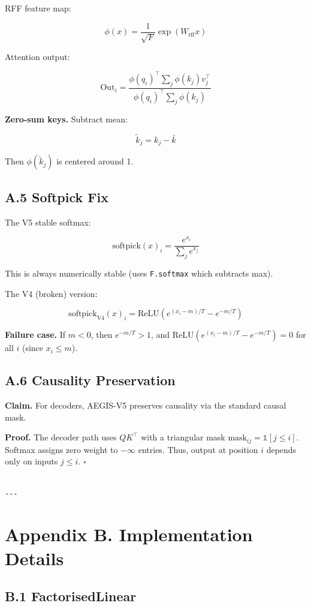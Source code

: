 RFF feature map:

\[
\phi(x) = \frac{1}{\sqrt{F}} \exp(W_\text{rff} x)
\]

Attention output:

\[
\text{Out}_i = \frac{\phi(q_i)^\top \sum_j \phi(k_j) v_j^\top}{\phi(q_i)^\top \sum_j \phi(k_j)}
\]

\textbf{Zero-sum keys.} Subtract mean:

\[
\tilde{k}_j = k_j - \bar{k}
\]

Then $\phi(\tilde{k}_j)$ is centered around 1.

\subsection{A.5 Softpick Fix}

The V5 stable softmax:

\[
\text{softpick}(x)_i = \frac{e^{x_i}}{\sum_j e^{x_j}}
\]

This is always numerically stable (uses \texttt{F.softmax} which subtracts max).

The V4 (broken) version:

\[
\text{softpick}_\text{V4}(x)_i = \text{ReLU}\!\left(e^{(x_i - m)/T} - e^{-m/T}\right)
\]

\textbf{Failure case.} If $m < 0$, then $e^{-m/T} > 1$, and 
$\text{ReLU}(e^{(x_i - m)/T} - e^{-m/T}) = 0$ for all $i$ (since 
$x_i \leq m$).

\subsection{A.6 Causality Preservation}

\textbf{Claim.} For decoders, AEGIS-V5 preserves causality via the standard 
causal mask.

\textbf{Proof.} The decoder path uses $Q K^\top$ with a triangular mask 
$\text{mask}_{ij} = \mathbb{1}[j \leq i]$. Softmax assigns zero weight to 
$-\infty$ entries. Thus, output at position $i$ depends only on inputs 
$j \leq i$. $\square$
\begin{lstlisting}

---
\end{lstlisting}

\section{Appendix B. Implementation Details}

\subsection{B.1 FactorisedLinear}

